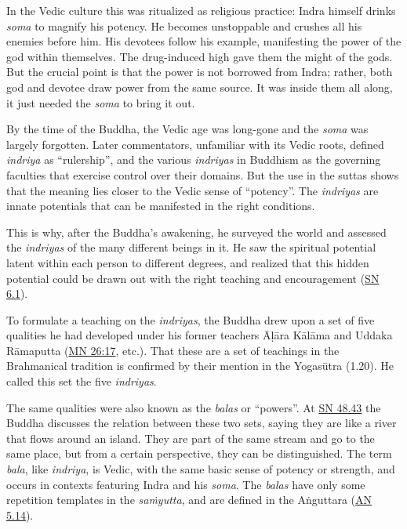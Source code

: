\documentclass[12pt,openany]{book}%
\begin{document}
In the Vedic culture this was ritualized as religious practice: Indra himself drinks \textit{soma} to magnify his potency. He becomes unstoppable and crushes all his enemies before him. His devotees follow his example, manifesting the power of the god within themselves. The drug-induced high gave them the might of the gods. But the crucial point is that the power is not borrowed from Indra; rather, both god and devotee draw power from the same source. It was inside them all along, it just needed the \textit{soma} to bring it out.

By the time of the Buddha, the Vedic age was long-gone and the \textit{soma} was largely forgotten. Later commentators, unfamiliar with its Vedic roots, defined \textit{indriya} as “rulership”, and the various \textit{indriyas} in Buddhism as the governing faculties that exercise control over their domains. But the use in the suttas shows that the meaning lies closer to the Vedic sense of “potency”. The \textit{indriyas} are innate potentials that can be manifested in the right conditions.

This is why, after the Buddha’s awakening, he surveyed the world and assessed the \textit{indriyas} of the many different beings in it. He saw the spiritual potential latent within each person to different degrees, and realized that this hidden potential could be drawn out with the right teaching and encouragement (\href{https://suttacentral.net/sn6.1}{SN 6.1}).

To formulate a teaching on the \textit{indriyas}, the Buddha drew upon a set of five qualities he had developed under his former teachers \textsanskrit{Āḷāra} \textsanskrit{Kālāma} and Uddaka \textsanskrit{Rāmaputta} (\href{https://suttacentral.net/mn26/en/sujato\#17}{MN 26:17}, etc.). That these are a set of teachings in the Brahmanical tradition is confirmed by their mention in the \textsanskrit{Yogasūtra} (1.20). He called this set the five \textit{indriyas}.

The same qualities were also known as the \textit{balas} or “powers”. At \href{https://suttacentral.net/sn48.43}{SN 48.43} the Buddha discusses the relation between these two sets, saying they are like a river that flows around an island. They are part of the same stream and go to the same place, but from a certain perspective, they can be distinguished. The term \textit{bala}, like \textit{indriya}, is Vedic, with the same basic sense of potency or strength, and occurs in contexts featuring Indra and his \textit{soma}. The \textit{balas} have only some repetition templates in the \textit{\textsanskrit{saṁyutta}}, and are defined in the \textsanskrit{Aṅguttara} (\href{https://suttacentral.net/an5.14}{AN 5.14}).
\end{document}
